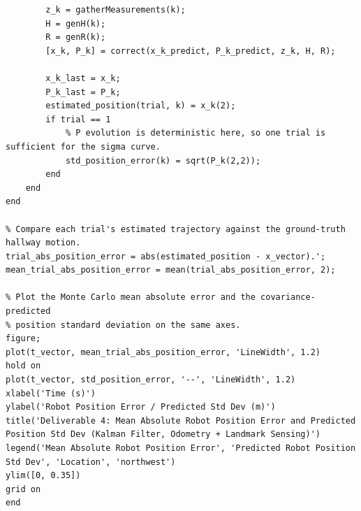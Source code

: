 \documentclass[11pt]{article}
\begin{document}
\begin{lstlisting}[caption={sim4.m}, label={lst:sim4}]
        % Step 2: Correct using the available measurements at this time-step.
        z_k = gatherMeasurements(k);
        H = genH(k);
        R = genR(k);
        [x_k, P_k] = correct(x_k_predict, P_k_predict, z_k, H, R);

        x_k_last = x_k;
        P_k_last = P_k;
        estimated_position(trial, k) = x_k(2);
        if trial == 1
            % P evolution is deterministic here, so one trial is sufficient for the sigma curve.
            std_position_error(k) = sqrt(P_k(2,2));
        end
    end
end

% Compare each trial's estimated trajectory against the ground-truth hallway motion.
trial_abs_position_error = abs(estimated_position - x_vector).';
mean_trial_abs_position_error = mean(trial_abs_position_error, 2);

% Plot the Monte Carlo mean absolute error and the covariance-predicted
% position standard deviation on the same axes.
figure; 
plot(t_vector, mean_trial_abs_position_error, 'LineWidth', 1.2)
hold on
plot(t_vector, std_position_error, '--', 'LineWidth', 1.2)
xlabel('Time (s)')
ylabel('Robot Position Error / Predicted Std Dev (m)')
title('Deliverable 4: Mean Absolute Robot Position Error and Predicted Position Std Dev (Kalman Filter, Odometry + Landmark Sensing)')
legend('Mean Absolute Robot Position Error', 'Predicted Robot Position Std Dev', 'Location', 'northwest')
ylim([0, 0.35])
grid on
end

\end{lstlisting}
\end{document}
